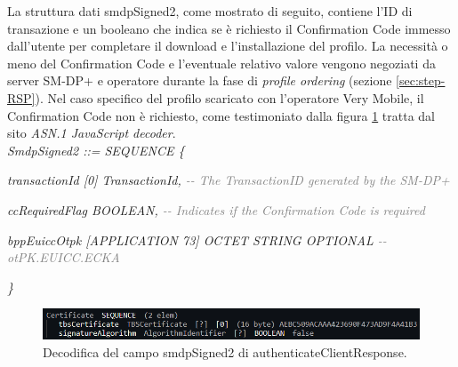 \documentclass[10pt, oneside]{book}
\begin{document}
La struttura dati smdpSigned2, come mostrato di seguito, contiene l'ID di transazione e un booleano che indica se è richiesto il Confirmation Code immesso dall'utente per completare il download e l'installazione del profilo. La necessità o meno del Confirmation Code e l'eventuale relativo valore vengono negoziati da server SM-DP+ e operatore durante la fase di \textit{profile ordering} (sezione \ref{sec:step-RSP}). Nel caso specifico del profilo scaricato con l'operatore Very Mobile, il Confirmation Code non è richiesto, come testimoniato dalla figura \ref{fig:decode-smdpSigned2} tratta dal sito \textit{ASN.1 JavaScript decoder}.\\

\textit{SmdpSigned2 ::= SEQUENCE \{}

\hspace{0.75cm} \textit{transactionId [0] TransactionId, \textcolor{gray}{{-}{-} The TransactionID generated by the SM-DP+}}

\hspace{0.75cm} \textit{ccRequiredFlag BOOLEAN, \textcolor{gray}{{-}{-} Indicates if the Confirmation Code is required}}

\hspace{0.75cm} \textit{bppEuiccOtpk [APPLICATION 73] OCTET STRING OPTIONAL \textcolor{gray}{{-}{-} otPK.EUICC.ECKA}}

\textit{\}\\}

\begin{figure}
\includegraphics[width=\linewidth]{decode-smdpSigned2.png}
\caption{Decodifica del campo smdpSigned2 di authenticateClientResponse.}
\label{fig:decode-smdpSigned2}
\end{figure}
\end{document}
